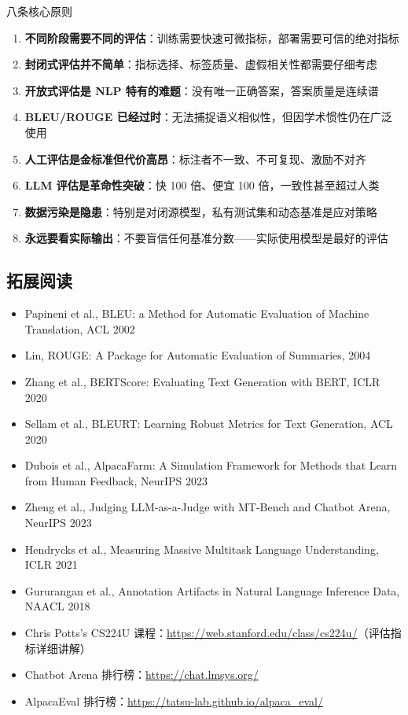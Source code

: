 \documentclass[a4paper]{article}
\begin{document}
\begin{importantbox}{八条核心原则}
\begin{enumerate}
    \item \textbf{不同阶段需要不同的评估}：训练需要快速可微指标，部署需要可信的绝对指标
    \item \textbf{封闭式评估并不简单}：指标选择、标签质量、虚假相关性都需要仔细考虑
    \item \textbf{开放式评估是 NLP 特有的难题}：没有唯一正确答案，答案质量是连续谱
    \item \textbf{BLEU/ROUGE 已经过时}：无法捕捉语义相似性，但因学术惯性仍在广泛使用
    \item \textbf{人工评估是金标准但代价高昂}：标注者不一致、不可复现、激励不对齐
    \item \textbf{LLM 评估是革命性突破}：快 100 倍、便宜 100 倍，一致性甚至超过人类
    \item \textbf{数据污染是隐患}：特别是对闭源模型，私有测试集和动态基准是应对策略
    \item \textbf{永远要看实际输出}：不要盲信任何基准分数——实际使用模型是最好的评估
\end{enumerate}
\end{importantbox}

\subsection{拓展阅读}

\begin{itemize}
    \item Papineni et al., BLEU: a Method for Automatic Evaluation of Machine Translation, ACL 2002
    \item Lin, ROUGE: A Package for Automatic Evaluation of Summaries, 2004
    \item Zhang et al., BERTScore: Evaluating Text Generation with BERT, ICLR 2020
    \item Sellam et al., BLEURT: Learning Robust Metrics for Text Generation, ACL 2020
    \item Dubois et al., AlpacaFarm: A Simulation Framework for Methods that Learn from Human Feedback, NeurIPS 2023
    \item Zheng et al., Judging LLM-as-a-Judge with MT-Bench and Chatbot Arena, NeurIPS 2023
    \item Hendrycks et al., Measuring Massive Multitask Language Understanding, ICLR 2021
    \item Gururangan et al., Annotation Artifacts in Natural Language Inference Data, NAACL 2018
    \item Chris Potts's CS224U 课程：\url{https://web.stanford.edu/class/cs224u/}（评估指标详细讲解）
    \item Chatbot Arena 排行榜：\url{https://chat.lmsys.org/}
    \item AlpacaEval 排行榜：\url{https://tatsu-lab.github.io/alpaca_eval/}
\end{itemize}
\end{document}
